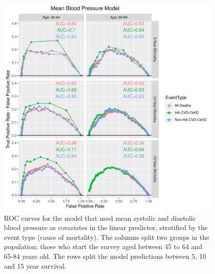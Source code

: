 \documentclass[
]{article}
\begin{document}
\begin{figure}
\hypertarget{fig:ROC_MeanBP}{%
\centering
\includegraphics{./Rmarkdown_Plots/ROC_MeanBPModel_CAx-EventType.png}
\caption{ROC curves for the model that used mean systolic and diastolic blood pressure as covariates in the linear predictor, stratified by the event type (cause of mortality). The columns split two groups in the population: those who start the survey aged between 45 to 64 and 65-84 years old. The rows split the model predictions between 5, 10 and 15 year survival.}\label{fig:ROC_MeanBP}
}
\end{figure}
\end{document}
